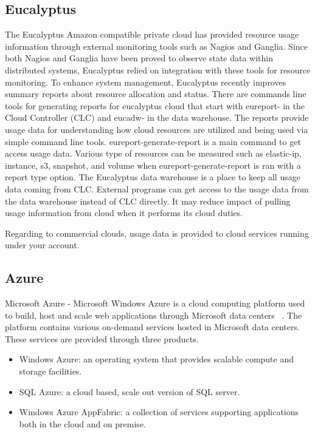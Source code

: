 \documentclass{sig-alternate}
\begin{document}
\subsection{Eucalyptus}

The Eucalyptus Amazon compatible private cloud has provided resource usage information through external monitoring tools such as Nagios and Ganglia. Since both Nagios and Ganglia have been proved to observe state data within distributed systems, Eucalyptus relied on integration with these tools for resource monitoring. To enhance system management, Eucalyptus recently improves summary reports about resource allocation and status. There are commands line tools for generating reports for eucalyptus cloud that start with eureport- in the Cloud Controller (CLC) and eucadw- in the data warehouse. The reports provide usage data for understanding how cloud resources are utilized and being used via simple command line tools. eureport-generate-report is a main command to get access usage data. Various type of resources can be measured such as elastic-ip, instance, s3, snapshot, and volume when eureport-generate-report is ran with a report type option. The Eucalyptus data warehouse is a place to keep all usage data coming from CLC. External programs can get access to the usage data from the data warehouse instead of CLC directly. It may reduce impact of pulling usage information from cloud when it performs its cloud duties. ~\cite{Euca2ools14}

Regarding to commercial clouds, usage data is provided to cloud services running under your account.

\subsection{Azure}

Microsoft Azure - Microsoft Windows Azure is a cloud computing platform used to build, host and scale web applications through Microsoft data centers ~\cite{azure11}. The platform contains various on-demand services hosted in Microsoft data centers. These services are provided through three products.

\begin{itemize}
 \item Windows Azure: an operating system that provides scalable compute and storage facilities.
 \item SQL Azure: a cloud based, scale out version of SQL server.
 \item Windows Azure AppFabric: a collection of services supporting applications both in the cloud and on premise.
\end{itemize}
\end{document}

